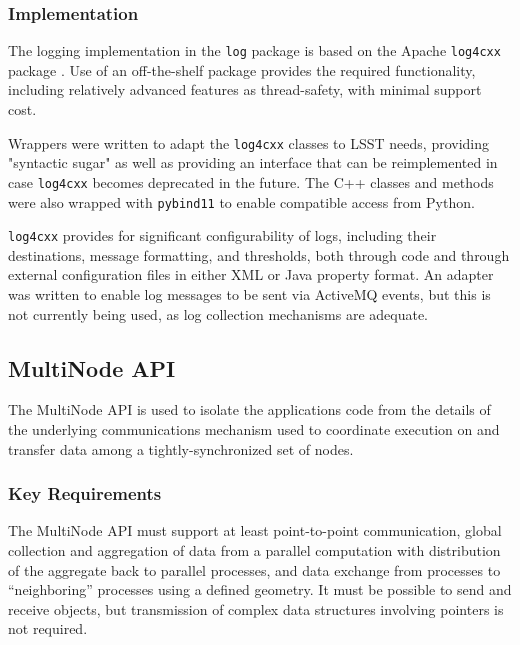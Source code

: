 \documentclass[DM,lsstdraft,toc]{lsstdoc}
\begin{document}
\subsubsection{Implementation}\label{logging-implementation}

The logging implementation in the \texttt{log} package is based on the Apache
\texttt{log4cxx} package \citep{log4cxx}.
Use of an off-the-shelf package provides the required functionality, including
relatively advanced features as thread-safety, with minimal support cost.

Wrappers were written to adapt the \texttt{log4cxx} classes to LSST needs,
providing "syntactic sugar" as well as providing an interface that can be
reimplemented in case \texttt{log4cxx} becomes deprecated in the future.  The
C++ classes and methods were also wrapped with \texttt{pybind11} to enable
compatible access from Python.

\texttt{log4cxx} provides for significant configurability of logs, including
their destinations, message formatting, and thresholds, both through code and
through external configuration files in either XML or Java property format.
An adapter was written to enable log messages to be sent via ActiveMQ events,
but this is not currently being used, as log collection mechanisms are
adequate.


\subsection{MultiNode API}\label{multinode-api}

The MultiNode API is used to isolate the applications code from the details of
the underlying communications mechanism used to coordinate execution on and
transfer data among a tightly-synchronized set of nodes.

\subsubsection{Key Requirements}\label{multinode-reqs}

The MultiNode API must support at least point-to-point communication, global
collection and aggregation of data from a parallel computation with
distribution of the aggregate back to parallel processes, and data
exchange from processes to ``neighboring'' processes using a defined
geometry. It must be possible to send and receive objects, but
transmission of complex data structures involving pointers is not
required.
\end{document}
